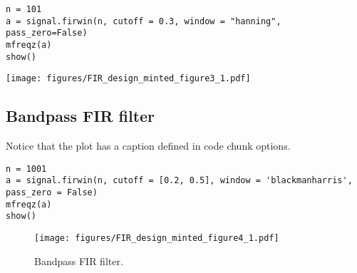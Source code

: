 \documentclass[a4paper,11pt,final]{article}
\begin{document}
\begin{verbatim}
n = 101
a = signal.firwin(n, cutoff = 0.3, window = "hanning", pass_zero=False)
mfreqz(a)
show()
\end{verbatim}
\texttt{[image: figures/FIR\_design\_minted\_figure3\_1.pdf]}


\subsection{Bandpass FIR filter}

Notice that the plot has a caption defined in code chunk options.



\begin{verbatim}
n = 1001
a = signal.firwin(n, cutoff = [0.2, 0.5], window = 'blackmanharris', pass_zero = False)
mfreqz(a)
show()
\end{verbatim}
\begin{figure}[htpb]
\center
\texttt{[image: figures/FIR\_design\_minted\_figure4\_1.pdf]}
\caption{Bandpass FIR filter.}
\label{fig:None}
\end{figure}
\end{document}
